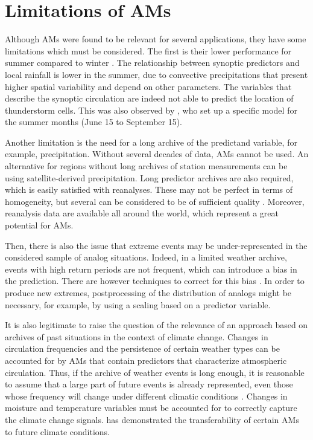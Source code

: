 \documentclass[gmd]{copernicus}
\begin{document}
\section{Limitations of AMs}
\label{sec:limitations}

Although AMs were found to be relevant for several applications, they have some limitations which must be considered. The first is their lower performance for summer compared to winter \citep{Bliefernicht2010}. The relationship between synoptic predictors and local rainfall is lower in the summer, due to convective precipitations that present higher spatial variability and depend on other parameters. The variables that describe the synoptic circulation are indeed not able to predict the location of thunderstorm cells. This was also observed by \citet{BenDaoud2010}, who set up a specific model for the summer months (June 15 to September 15).

Another limitation is the need for a long archive of the predictand variable, for example, precipitation. Without several decades of data, AMs cannot be used. An alternative for regions without long archives of station measurements can be using satellite-derived precipitation. Long predictor archives are also required, which is easily satisfied with reanalyses. These may not be perfect in terms of homogeneity, but several can be considered to be of sufficient quality \cite{Horton2018b}. Moreover, reanalysis data are available all around the world, which represent a great potential for AMs.

Then, there is also the issue that extreme events may be under-represented in the considered sample of analog situations. Indeed, in a limited weather archive, events with high return periods are not frequent, which can introduce a bias in the prediction. There are however techniques to correct for this bias \citep[see][]{Marty2010}. In order to produce new extremes, postprocessing of the distribution of analogs might be necessary, for example, by using a scaling based on a predictor variable. 

It is also legitimate to raise the question of the relevance of an approach based on archives of past situations in the context of climate change. Changes in circulation frequencies and the persistence of certain weather types \citep{Hewitson1996} can be accounted for by AMs that contain predictors that characterize atmospheric circulation. Thus, if the archive of weather events is long enough, it is reasonable to assume that a large part of future events is already represented, even those whose frequency will change under different climatic conditions \citep{Wetterhall2005}. Changes in moisture and temperature variables must be accounted for to correctly capture the climate change signals. \citet{Dayon2015} has demonstrated the transferability of certain AMs to future climate conditions.
\end{document}
